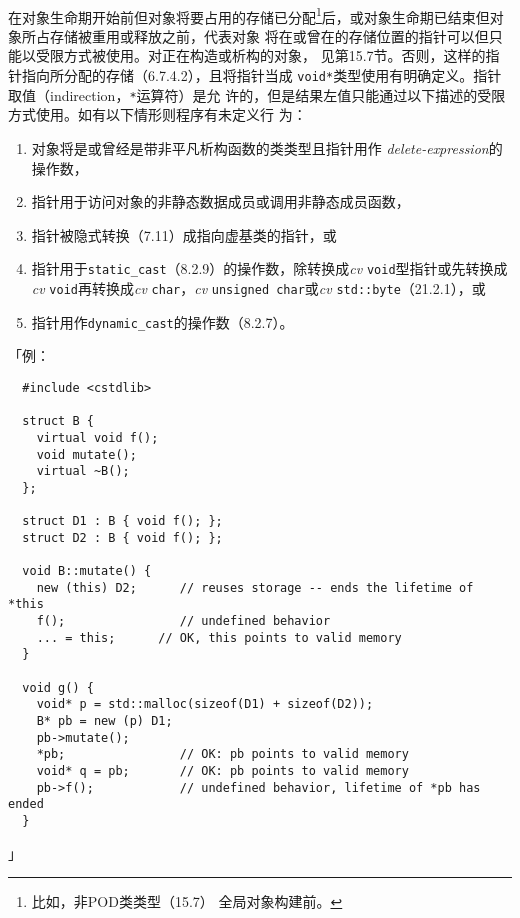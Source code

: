 \paragraph{}
在对象生命期开始前但对象将要占用的存储已分配\footnote{比如，非POD类类型（15.7）
全局对象构建前。}后，或对象生命期已结束但对象所占存储被重用或释放之前，代表对象
将在或曾在的存储位置的指针可以但只能以受限方式被使用。对正在构造或析构的对象，
见第15.7节。否则，这样的指针指向所分配的存储（6.7.4.2），且将指针当成
\texttt{void*}类型使用有明确定义。指针取值（indirection，\texttt{*}运算符）是允
许的，但是结果左值只能通过以下描述的受限方式使用。如有以下情形则程序有未定义行
为：
\begin{enumerate}
  \item{对象将是或曾经是带非平凡析构函数的类类型且指针用作
    \textit{delete-expression}的操作数，}
  \item{指针用于访问对象的非静态数据成员或调用非静态成员函数，}
  \item{指针被隐式转换（7.11）成指向虚基类的指针，或}
  \item{指针用于\texttt{static\_cast}（8.2.9）的操作数，除转换成\textit{cv}
    \texttt{void}型指针或先转换成\textit{cv} \texttt{void}再转换成\textit{cv}
    \texttt{char}，\textit{cv} \texttt{unsigned char}或\textit{cv}
    \texttt{std::byte}（21.2.1），或}
  \item{指针用作\texttt{dynamic\_cast}的操作数（8.2.7）。}
\end{enumerate}
「例：
\begin{lstlisting}
  #include <cstdlib>

  struct B {
    virtual void f();
    void mutate();
    virtual ~B();
  };

  struct D1 : B { void f(); };
  struct D2 : B { void f(); };

  void B::mutate() {
    new (this) D2;      // reuses storage -- ends the lifetime of *this
    f();                // undefined behavior
    ... = this;      // OK, this points to valid memory
  }

  void g() {
    void* p = std::malloc(sizeof(D1) + sizeof(D2));
    B* pb = new (p) D1;
    pb->mutate();
    *pb;                // OK: pb points to valid memory
    void* q = pb;       // OK: pb points to valid memory
    pb->f();            // undefined behavior, lifetime of *pb has ended
  }
\end{lstlisting}」

